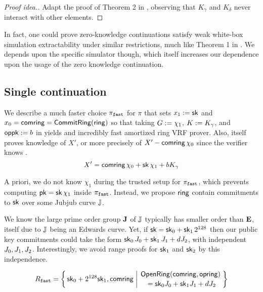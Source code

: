 \begin{proof}[Proof idea.]
Adapt the proof of Theorem 2 in \cite[\S3, pp. 9]{RandomizationGroth16},
observing that $K_\gamma$ and $K_\delta$ never interact with other elements. 
\end{proof}


In fact, one could prove zero-knowledge continuations satisfy
weak white-box simulation extractability under similar restrictions,
much like Theorem 1 in \cite[\S3, pp. 8 \& 11]{RandomizationGroth16}.
We depends upon the specific simulator though, which itself increases
our dependence upon the usage of the zero knowledge continuation.


\subsection{Single continuation}
\label{subsec:rvrf_faster}

We describe a much faster choice $\pi_{\mathtt{fast}}$ for $\pi$
that sets $x_1 := \mathsf{sk}$ and $x_0 = \mathsf{comring} = {\mathsf{CommitRing}}(\mathsf{ring})$ so that
taking $G := \chi_1$, $K := K_\gamma$, and $\mathsf{oppk} := b$ in \PedVRF
yields and incredibly fast amortized ring VRF prover.
Also, \PedVRF itself proves knowledge of $X'$,
 or more precisely of $X' - \mathsf{comring}\, \chi_0$ since the verifier knows \comring.
$$ X' = \mathsf{comring}\, \chi_0 + \mathsf{sk}\, \chi_1 + b K_\gamma $$


A priori, we do not know $\chi_1$ during the trusted setup for $\pi_{\mathtt{fast}}$,
which prevents computing $\mathsf{pk} = \mathsf{sk}\, \chi_1$ inside $\pi_{\mathtt{fast}}$.
Instead, we propose $\mathsf{ring}$ contain commitments to $\mathsf{sk}$ over
some Jubjub curve ${\mathbb{J}}$.  

We know the large prime order group ${\mathbf{J}}$ of ${\mathbb{J}}$ typically has
smaller order than ${\mathbf{E}}$, itself due to ${\mathbb{J}}$ being an Edwards curve. 
Yet, if $\mathsf{sk} = \mathsf{sk}_0 + \mathsf{sk}_1 \, 2^{128}$ then our public key commitments could
take the form $\mathsf{sk}_0\, J_0 + \mathsf{sk}_1\, J_1 + d J_2$,
with independent $J_0,J_1,J_2$.
Interestingly, we avoid range proofs for $\mathsf{sk}_1$ and $\mathsf{sk}_2$
by this independence. 

$$ \Rfast = \Setst{ \sk_0 + 2^{128} \sk_1, \comring }{
 \eprint{ \exists d,\openring \textrm{\ s.t.\ } }{}
 \genfrac{}{}{0pt}{}{ \eprint{\rVRF.}{}\OpenRing(\comring,\openring) }{ \,\, = \sk_0 \genJ_0 + \sk_1 \genJ_1 + d \genJ_2 }
} $$ %

